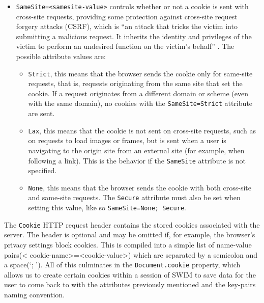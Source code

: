 \documentclass[
    paper=letter,
    parskip=half,
    fontsize=12pt,
    titlepage=firstiscover,
    toc=bibliography,
    numbers=endperiod
]{scrartcl}
\begin{document}
\begin{itemize}
    \item \texttt{SameSite=\textless samesite-value\textgreater{}} controls
          whether or not a cookie is sent with cross-site requests, providing
          some protection against cross-site request forgery attacks (CSRF),
          which is ``an attack that tricks the victim into submitting a
          malicious request. It inherits the identity and privileges of the
          victim to perform an undesired function on the victim's
          behalf'' \cite{owasp-csrf}. The possible attribute values are:
          \begin{itemize}
              \item \texttt{Strict}, this means that the browser sends the cookie only
                    for same-site requests, that is, requests originating from the same
                    site that set the cookie. If a request originates from a different
                    domain or scheme (even with the same domain), no cookies with the
                    \texttt{SameSite=Strict} attribute are sent.
              \item \texttt{Lax}, this means that the cookie is not sent on cross-site
                    requests, such as on requests to load images or frames, but is sent
                    when a user is navigating to the origin site from an external site
                    (for example, when following a link). This is the behavior if the
                    \texttt{SameSite} attribute is not specified.
              \item \texttt{None}, this means that the browser sends the cookie with
                    both cross-site and same-site requests. The \texttt{Secure} attribute must
                    also be set when setting this value, like so \texttt{SameSite=None;
                        Secure}.
          \end{itemize}
\end{itemize}

The \texttt{Cookie} HTTP request header contains the stored cookies
associated with the server. The header is optional and may be omitted
if, for example, the browser's privacy settings block cookies. This is
compiled into a simple list of name-value pairs(\textless
cookie-name\textgreater=\textless cookie-value\textgreater) which are
separated by a semicolon and a space(`; '). All of this culminates in
the \texttt{Document.cookie} property, which allows us to create certain
cookies within a session of SWIM to save data for the user to come back
to with the attributes previously mentioned and the key-pairs naming
convention.
\end{document}
